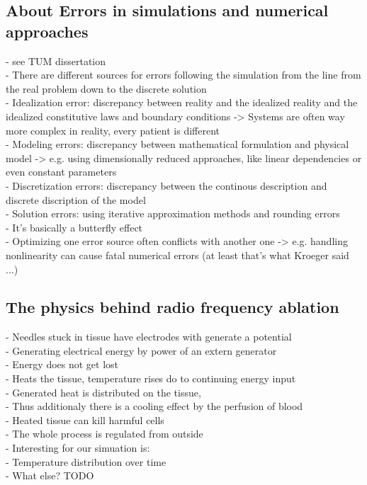 \documentclass[parskip=half, titlepage=yes, 12pt, BCOR=12mm, DIV=calc]{scrartcl}
\begin{document}
\subsection{About Errors in simulations and numerical approaches}
- see TUM dissertation \\
- There are different sources for errors following the simulation from the line from the real problem down to the discrete solution \\
- Idealization error: discrepancy between reality and the idealized reality and the idealized constitutive laws and boundary conditions -> Systems are often way more complex in reality, every patient is different \\
- Modeling errors: discrepancy between mathematical formulation and physical model -> e.g. using dimensionally reduced approaches, like linear dependencies or even constant parameters  \\
-  Discretization errors: discrepancy between the continous description and discrete discription of the model \\
- Solution errors: using iterative approximation methods and rounding errors \\
- It's basically a butterfly effect \\
- Optimizing one error source often conflicts with another one -> e.g. handling nonlinearity can cause fatal numerical errors (at least that's what Kroeger said ...)


\subsection{The physics behind radio frequency ablation}
- Needles stuck in tissue have electrodes with generate a potential \\
- Generating electrical energy by power of an extern generator \\
- Energy does not get lost \\
- Heats the tissue, temperature rises do to continuing energy input \\
- Generated heat is distributed on the tissue,  \\
- Thus additionaly there is a cooling effect by the perfusion of blood \\
- Heated tissue can kill harmful cells \\
- The whole process is regulated from outside \\

- Interesting for our simuation is: \\
- Temperature distribution over time \\
- What else? TODO \\
\end{document}
